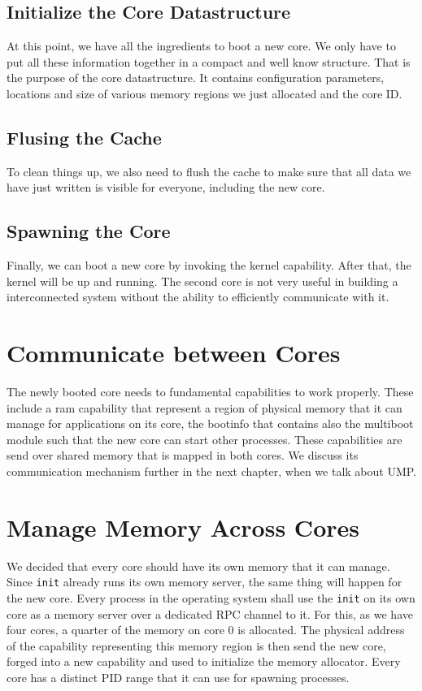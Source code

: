 \subsection{Initialize the Core Datastructure}

At this point, we have all the ingredients to boot a new core. We only have to
put all these information together in a compact and well know structure. That is
the purpose of the core datastructure. It contains configuration parameters,
locations and size of various memory regions we just allocated and the core ID.

\subsection{Flusing the Cache}
To clean things up, we also need to flush the cache to make sure that all data
we have just written is visible for everyone, including the new core.

\subsection{Spawning the Core}

Finally, we can boot a new core by invoking the kernel capability. 
After that, the kernel will be up and running. The second core is not very useful
in building a interconnected system without the ability to efficiently communicate with it.

\section{Communicate between Cores}

The newly booted core needs to fundamental capabilities to work properly. These
include a ram capability that represent a region of physical memory that it can
manage for applications on its core, the bootinfo that contains also the
multiboot module such that the new core can start other processes.  These
capabilities are send over shared memory that is mapped in both cores. We
discuss its communication mechanism further in the next chapter, when we talk about
UMP.

\section{Manage Memory Across Cores}

We decided that every core should have its own memory that it can manage. 
Since \texttt{init} already runs its own memory server, the same thing will happen 
for the new core. Every process in the operating system shall use the \texttt{init}
on its own core as a memory server over a dedicated RPC channel to it.
For this, as we have four cores, a quarter of the memory on core 0 is allocated. The
physical address of the capability representing this memory region is then send
the new core, forged into a new capability and used to initialize the memory
allocator. Every core has a distinct PID range that it can use for spawning
processes.

